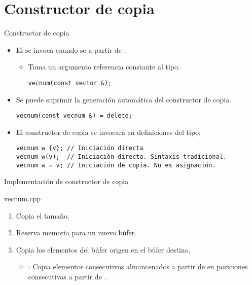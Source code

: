 \section{Constructor de copia}

\begin{frame}[fragile]{Constructor de copia}
\begin{itemize}
  \item El  se invoca cuando se 
         a partir de .
    \begin{itemize}
      \item Toma un argumento referencia constante al tipo.
\begin{lstlisting}
vecnum(const vector &);
\end{lstlisting}
    \end{itemize}

  \item Se puede suprimir la generación automática del constructor de copia.
\begin{lstlisting}
vecnum(const vecnum &) = delete;
\end{lstlisting}

  \item El constructor de copia se invocará en definiciones del tipo:
\begin{lstlisting}
vecnum w {v}; // Iniciación directa
vecnum w(v);  // Iniciación directa. Sintaxis tradicional.
vecnum w = v; // Iniciación de copia. No es asignación.
\end{lstlisting}
\end{itemize}
\end{frame}

\begin{frame}[t]{Implementación de constructor de copia}
\begin{block}{vecnum.cpp}

\end{block}

\begin{enumerate}
  \item Copia el tamaño.
  \item Reserva memoria para un nuevo búfer.
  \item Copia los elementos del búfer origen en el búfer destino.
    \begin{itemize}
      \item {}: Copia  elementos consecutivos almancenados
            a partir de  en posiciones consecutivas a partir de .
    \end{itemize} 
\end{enumerate}
\end{frame}
